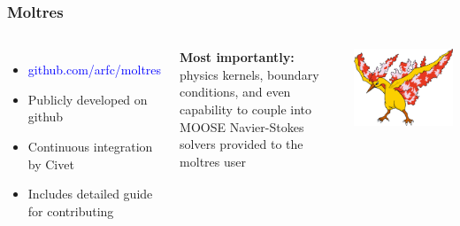 \begin{frame}
  \frametitle{Moltres}
  \begin{columns}
  \column[t]{5cm}
  \begin{itemize}
  \item{\textcolor{blue}{github.com/arfc/moltres}}
  \item{Publicly developed on github}
  \item{Continuous integration by Civet}
  \item{Includes detailed guide for contributing}
  \end{itemize}

  \textbf{Most importantly:} physics kernels, boundary conditions, and even capability to couple
  into MOOSE Navier-Stokes solvers provided to the moltres user


  \column[t]{5cm}

  \includegraphics[width=\textwidth]{moltres}

  \end{columns}
\end{frame}
